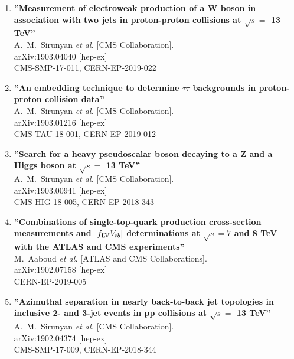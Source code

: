 \begin{enumerate}
\item%
{\bf ''Measurement of electroweak production of a W boson in association with two jets in proton-proton collisions at $\sqrt{s}=$ 13 TeV''}
  \\{}A.~M.~Sirunyan {\it et al.} [CMS Collaboration].
  \\{}arXiv:1903.04040 [hep-ex]
  \\{}CMS-SMP-17-011, CERN-EP-2019-022

\item%
{\bf ''An embedding technique to determine $\tau\tau$ backgrounds in proton-proton collision data''}
  \\{}A.~M.~Sirunyan {\it et al.} [CMS Collaboration].
  \\{}arXiv:1903.01216 [hep-ex]
  \\{}CMS-TAU-18-001, CERN-EP-2019-012

\item%
{\bf ''Search for a heavy pseudoscalar boson decaying to a Z and a Higgs boson at $\sqrt{s}=$ 13 TeV''}
  \\{}A.~M.~Sirunyan {\it et al.} [CMS Collaboration].
  \\{}arXiv:1903.00941 [hep-ex]
  \\{}CMS-HIG-18-005, CERN-EP-2018-343

\item%
{\bf ''Combinations of single-top-quark production cross-section measurements and $|f_{\rm LV}V_{tb}|$ determinations at $\sqrt{s}=7$ and 8 TeV with the ATLAS and CMS experiments''}
  \\{}M.~Aaboud {\it et al.} [ATLAS and CMS Collaborations].
  \\{}arXiv:1902.07158 [hep-ex]
  \\{}CERN-EP-2019-005

\item%
{\bf ''Azimuthal separation in nearly back-to-back jet topologies in inclusive 2- and 3-jet events in pp collisions at $\sqrt{s}=$ 13 TeV''}
  \\{}A.~M.~Sirunyan {\it et al.} [CMS Collaboration].
  \\{}arXiv:1902.04374 [hep-ex]
  \\{}CMS-SMP-17-009, CERN-EP-2018-344


\end{enumerate}
